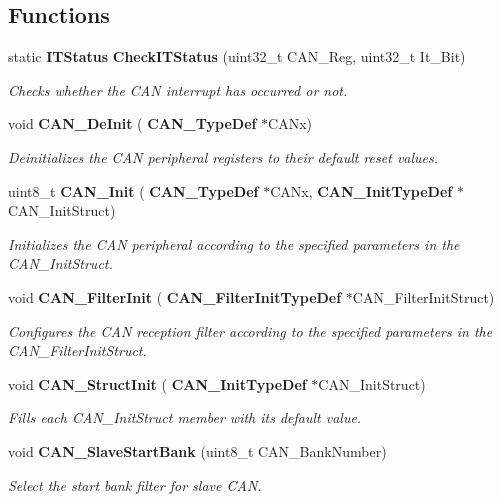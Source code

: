 \subsection*{Functions}
\begin{DoxyCompactItemize}
\item 
static \textbf{ I\+T\+Status} \textbf{ Check\+I\+T\+Status} (uint32\+\_\+t C\+A\+N\+\_\+\+Reg, uint32\+\_\+t It\+\_\+\+Bit)
\begin{DoxyCompactList}\small\item\em Checks whether the C\+AN interrupt has occurred or not. \end{DoxyCompactList}\item 
void \textbf{ C\+A\+N\+\_\+\+De\+Init} (\textbf{ C\+A\+N\+\_\+\+Type\+Def} $\ast$C\+A\+Nx)
\begin{DoxyCompactList}\small\item\em Deinitializes the C\+AN peripheral registers to their default reset values. \end{DoxyCompactList}\item 
uint8\+\_\+t \textbf{ C\+A\+N\+\_\+\+Init} (\textbf{ C\+A\+N\+\_\+\+Type\+Def} $\ast$C\+A\+Nx, \textbf{ C\+A\+N\+\_\+\+Init\+Type\+Def} $\ast$C\+A\+N\+\_\+\+Init\+Struct)
\begin{DoxyCompactList}\small\item\em Initializes the C\+AN peripheral according to the specified parameters in the C\+A\+N\+\_\+\+Init\+Struct. \end{DoxyCompactList}\item 
void \textbf{ C\+A\+N\+\_\+\+Filter\+Init} (\textbf{ C\+A\+N\+\_\+\+Filter\+Init\+Type\+Def} $\ast$C\+A\+N\+\_\+\+Filter\+Init\+Struct)
\begin{DoxyCompactList}\small\item\em Configures the C\+AN reception filter according to the specified parameters in the C\+A\+N\+\_\+\+Filter\+Init\+Struct. \end{DoxyCompactList}\item 
void \textbf{ C\+A\+N\+\_\+\+Struct\+Init} (\textbf{ C\+A\+N\+\_\+\+Init\+Type\+Def} $\ast$C\+A\+N\+\_\+\+Init\+Struct)
\begin{DoxyCompactList}\small\item\em Fills each C\+A\+N\+\_\+\+Init\+Struct member with its default value. \end{DoxyCompactList}\item 
void \textbf{ C\+A\+N\+\_\+\+Slave\+Start\+Bank} (uint8\+\_\+t C\+A\+N\+\_\+\+Bank\+Number)
\begin{DoxyCompactList}\small\item\em Select the start bank filter for slave C\+AN. \end{DoxyCompactList}\item 

\end{DoxyCompactItemize}
